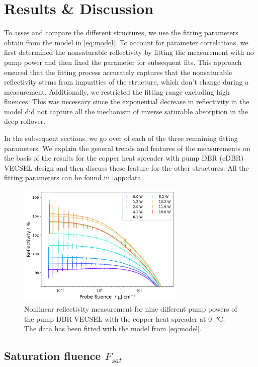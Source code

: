 \chapter{Results \& Discussion}\label{chapter:results}

To asses and compare the different structures, we use the fitting parameters obtain from the model in \cref{eq:model}. To account for parameter correlations, we first determined the nonsaturable reflectivity by fitting the measurement with no pump power and then fixed the parameter for subsequent fits. This approach ensured that the fitting process accurately captures that the nonsaturable reflectivity stems from impurities of the structure, which don't change during a measurement. Additionally, we restricted the fitting range excluding high fluences. This was necessary since the exponential decrease in reflectivity in the model did not capture all the mechanism of inverse saturable absorption in the deep rollover.

In the subsequent sections, we go over of each of the three remaining fitting parameters. We explain the general trends and features of the measurements on the basis of the results for the copper heat spreader with pump DBR (cDBR) VECSEL design and then discuss these feature for the other structures. All the fitting parameters can be found in \cref{app:data}.

\begin{figure}[ht]
    \centering
    \includegraphics[width=8cm]{images/sv167-b5.png}
    \caption{Nonlinear reflectivity measurement for nine different pump powers of the pump DBR VECSEL with the copper heat spreader at \qty{0}{\celsius}. The data has been fitted with the model from \cref{eq:model}.}
    \label{fig:gainSV167}
\end{figure}

\section{\texorpdfstring{Saturation fluence $F_{sat}$}{Saturation fluence Fsat}}

